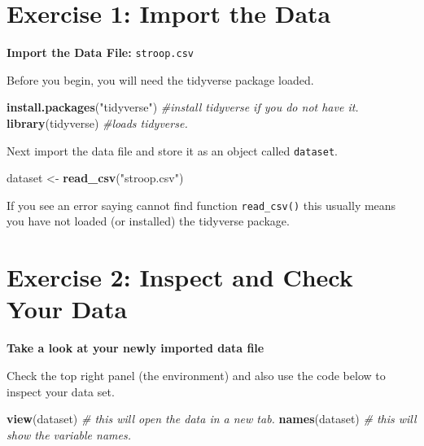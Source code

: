 \documentclass[
]{book}
\newenvironment{Shaded}{\begin{snugshade}}{\end{snugshade}}
\newcommand{\CommentTok}[1]{\textcolor[rgb]{0.56,0.35,0.01}{\textit{#1}}}
\newcommand{\FunctionTok}[1]{\textcolor[rgb]{0.13,0.29,0.53}{\textbf{#1}}}
\newcommand{\NormalTok}[1]{#1}
\newcommand{\OtherTok}[1]{\textcolor[rgb]{0.56,0.35,0.01}{#1}}
\newcommand{\StringTok}[1]{\textcolor[rgb]{0.31,0.60,0.02}{#1}}
\let\oldsection\section
\renewcommand{\section}{\needspace{5\baselineskip}\oldsection}
\begin{document}
\section{Exercise 1: Import the Data}\label{exercise-1-import-the-data-1}

\textbf{Import the Data File:} \texttt{stroop.csv}

Before you begin, you will need the tidyverse package loaded.

\begin{Shaded}
\begin{Highlighting}[]
\FunctionTok{install.packages}\NormalTok{(}\StringTok{"tidyverse"}\NormalTok{) }\CommentTok{\#install tidyverse if you do not have it.}
\FunctionTok{library}\NormalTok{(tidyverse) }\CommentTok{\#loads tidyverse.}
\end{Highlighting}
\end{Shaded}

Next import the data file and store it as an object called \texttt{dataset}.

\begin{Shaded}
\begin{Highlighting}[]
\NormalTok{dataset }\OtherTok{\textless{}{-}} \FunctionTok{read\_csv}\NormalTok{(}\StringTok{"stroop.csv"}\NormalTok{)}
\end{Highlighting}
\end{Shaded}

If you see an error saying cannot find function \texttt{read\_csv()} this usually means you have not loaded (or installed) the tidyverse package.

\section{Exercise 2: Inspect and Check Your Data}\label{exercise-2-inspect-and-check-your-data-1}

\textbf{Take a look at your newly imported data file}

Check the top right panel (the environment) and also use the code below to inspect your data set.

\begin{Shaded}
\begin{Highlighting}[]
\FunctionTok{view}\NormalTok{(dataset) }\CommentTok{\# this will open the data in a new tab.}
\FunctionTok{names}\NormalTok{(dataset) }\CommentTok{\# this will show the variable names.}
\end{Highlighting}
\end{Shaded}
\end{document}
